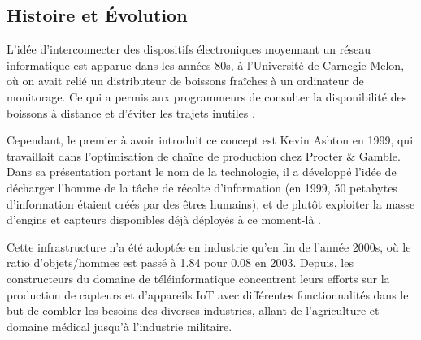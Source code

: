 \subsection{Histoire et Évolution}
L'idée d'interconnecter des dispositifs électroniques moyennant un réseau informatique est apparue dans les années 80s, à l'Université de Carnegie Melon, où on avait relié un distributeur de boissons fraîches à un ordinateur de monitorage. Ce qui a permis aux programmeurs de consulter la disponibilité des boissons à distance et d'éviter les trajets inutiles \cite{madakam2015}.\par
Cependant, le premier à avoir introduit ce concept est Kevin Ashton en 1999, qui travaillait dans l'optimisation de chaîne de production chez Procter \& Gamble. Dans sa présentation portant le nom de la technologie, il a développé l'idée de décharger l'homme de la tâche de récolte d'information (en 1999, 50 petabytes d'information étaient créés par des êtres humains), et de plutôt exploiter la masse d'engins et capteurs disponibles déjà déployés à ce moment-là \cite{ashton2009}.\par
Cette infrastructure n'a été adoptée en industrie qu'en fin de l'année 2000s, où le ratio d'objets/hommes est passé à 1.84 pour 0.08 en 2003. Depuis, les constructeurs du domaine de téléinformatique concentrent leurs efforts sur la production de capteurs et d'appareils IoT avec différentes fonctionnalités dans le but de combler les besoins des diverses industries, allant de l'agriculture et domaine médical jusqu'à l'industrie militaire.

